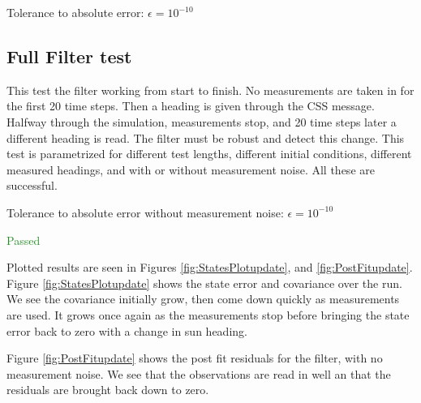 \documentclass[]{BasiliskReportMemo}
\begin{document}
Tolerance to absolute error: $\epsilon = 10^{-10}$

\subsection{Full Filter test}

This test the filter working from start to finish. No measurements are taken in for the first 20 time steps. Then a heading is given through the CSS message. Halfway through the simulation, measurements stop, and 20 time steps later a different heading is read. The filter must be robust and detect this change. This test is parametrized for different test lengths, different initial conditions, different measured headings, and with or without measurement noise. All these are successful.

\vspace{0.2cm}
Tolerance to absolute error without measurement noise: $\epsilon = 10^{-10}$

\textcolor{ForestGreen}{Passed}

Plotted results are seen in Figures \ref{fig:StatesPlotupdate}, and \ref{fig:PostFitupdate}. Figure \ref{fig:StatesPlotupdate} shows the state error and covariance over the run. We see the covariance initially grow, then come down quickly as measurements are used. It grows once again as the measurements stop before bringing the state error back to zero with a change in sun heading. 

Figure \ref{fig:PostFitupdate} shows the post fit residuals for the filter, with no measurement noise. We see that the observations are read in well an that the residuals are brought back down to zero.

%
%


\end{document}
